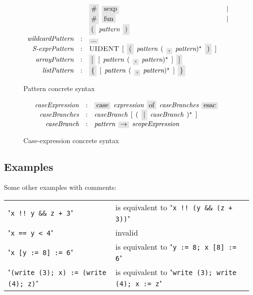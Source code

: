 \begin{figure}[t]
\[\begin{array}{rcll}
                                &   & \term{\#}\s\term{sexp} & \alt \\
                                &   & \term{\#}\s\term{fun} & \alt \\
                                &   & \term{(}\s\nonterm{pattern}\s\term{)} & \\
      \defterm{wildcardPattern} & : & \term{\_} &\\
      \defterm{S-exprPattern}   & : & \token{UIDENT}\s[\s\term{(}\s\nonterm{pattern}\s(\s\term{,}\s\nonterm{pattern})^\star\s\term{)}\s] &\\
      \defterm{arrayPattern}    & : & \term{[}\s[\s\nonterm{pattern}\s(\s\term{,}\s\nonterm{pattern})^\star\s]\s\term{]} &\\
      \defterm{listPattern}     & : & \term{\{}\s[\s\nonterm{pattern}\s(\s\term{,}\s\nonterm{pattern})^\star\s]\s\term{\}} &
    \end{array}
  \]
  \caption{Pattern concrete syntax}
  \label{pattern}
\end{figure}

\begin{figure}[t]
  \[
    \begin{array}{rcl}
      \defterm{caseExpression}  & : & \term{case}\s\nonterm{expression}\s\term{of}\s\nonterm{caseBranches}\s\term{esac}\\
      \defterm{caseBranches}    & : & \nonterm{caseBranch}\s[\s(\s\term{$\mid$}\s\nonterm{caseBranch}\s)^\star\s]\\
      \defterm{caseBranch}      & : & \nonterm{pattern}\s\term{$\rightarrow$}\s\nonterm{scopeExpression}
    \end{array}
  \]
  \caption{Case-expression concrete syntax}
  \label{case_expression}
\end{figure}

\subsection{Examples}
\label{sec:expression_examples}

Some other examples with comments:

\begin{tabular}{ll}
  "\lstinline|x !! y && z + 3|" & is equivalent to "\lstinline|x !! (y && (z + 3))|"\\
  "\lstinline|x == y < 4|"      & invalid \\
  "\lstinline|x [y := 8] := 6|" & is equivalent to "\lstinline|y := 8; x [8] := 6|"\\
  "\lstinline|(write (3); x) := (write (4); z)|" & is equivalent to "\lstinline|write (3); write (4); x := z|"
\end{tabular}


